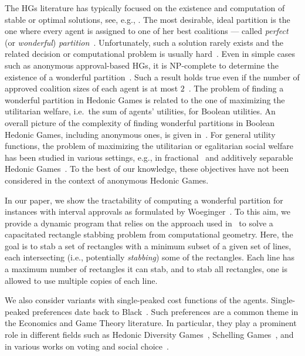 \documentclass[a4paper]{article}
\begin{document}
The HGs literature has typically focused on the existence and computation of stable or optimal solutions, see, e.g., \cite{bogomolnaia2002stability}. The most desirable, ideal partition is the one where every agent is assigned to one of her best coalitions --- called {\em perfect} (or {\em wonderful}) {\em partition}~\cite{aziz2013pareto}. Unfortunately, such a solution rarely exists and the related decision or computational problem is usually hard~\cite{aziz2013pareto,peters2016complexity}.
Even in simple cases such as anonymous approval-based HGs, it is NP-complete to determine the existence of a wonderful partition~\cite{Darmann_journal,woeginger2013core}. 
Such a result holds true even if the number of approved coalition sizes of each agent is at most $2$~\cite{Darmann_journal}.
The problem of finding a wonderful partition in Hedonic Games is related to the one of maximizing the utilitarian welfare, i.e.\ the sum of agents' utilities, for Boolean utilities. An overall picture of the complexity of finding wonderful partitions in Boolean Hedonic Games, including anonymous ones, is given in~\cite{peters2016complexity}. For general utility functions, the problem of maximizing the utilitarian or egalitarian social welfare has been studied in various settings, e.g., in fractional~\cite{AGGMT15} and additively separable Hedonic Games~\cite{ABG16}. To the best of our knowledge, these objectives have not been considered in the context of anonymous Hedonic Games.

In our paper, we show the tractability of computing a wonderful partition for instances with interval approvals as formulated by Woeginger~\cite{woeginger2013core}. To this aim, we provide a dynamic program that relies on the approach used in~\cite{rectangle_stabbing} to solve a capacitated rectangle stabbing problem from computational geometry. 
 Here, the goal is to stab a set of rectangles with a minimum subset of a given set of lines, each intersecting (i.e., potentially \emph{stabbing}) some of the rectangles. Each line has a maximum number of rectangles it can stab, and to stab all rectangles, one is allowed to use multiple copies of each line.

 We also consider variants with single-peaked cost functions of the agents. Single-peaked preferences date back to Black~\cite{black1948rationale}. Such preferences are a common theme in the Economics and Game Theory literature. In particular, they play a prominent role in different fields such as Hedonic Diversity Games~\cite{BredereckEI19,BoehmerE20}, Schelling Games~\cite{BiloBLM22,FriedrichLMS23}, and in various works on voting and social choice~\cite{Walsh07,YCE13,BSU13,ElkindFS20,BBHH15}.
\end{document}
